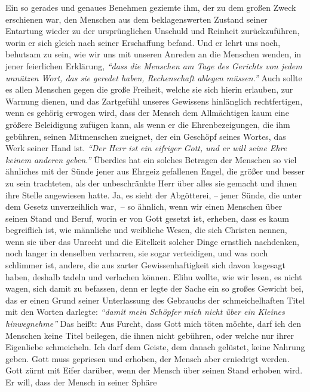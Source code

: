 Ein so gerades und genaues Benehmen geziemte ihm, der zu dem großen Zweck
erschienen war, den Menschen aus dem beklagenswerten Zustand seiner Entartung
wieder zu der ursprünglichen Unschuld und Reinheit zurückzuführen, worin er sich
gleich nach seiner Erschaffung befand. Und er lehrt uns noch, behutsam zu sein,
wie wir uns mit unseren Anreden an die Menschen wenden, in jener feierlichen
Erklärung,
\textit{"`dass die Menschen am Tage des Gerichts von jedem unnützen Wort, das
sie geredet haben, Rechenschaft ablegen
müssen."'}
Auch sollte es allen Menschen gegen die große Freiheit, welche sie sich hierin
erlauben, zur Warnung dienen, und das Zartgefühl unseres Gewissens hinlänglich
rechtfertigen, wenn es gehörig erwogen wird, dass der Mensch dem Allmächtigen
kaum eine größere Beleidigung zufügen kann, als wenn er die Ehrenbezeigungen,
die ihm gebühren, seinen Mitmenschen zueignet, der ein Geschöpf seines Wortes,
das Werk seiner Hand ist.
\textit{"`Der Herr ist ein eifriger Gott, und er will seine
Ehre keinem anderen geben."'} Überdies hat ein solches Betragen der Menschen so
viel ähnliches mit der Sünde jener aus Ehrgeiz gefallenen Engel, die größer und
besser zu sein trachteten, als der unbeschränkte Herr über alles sie gemacht und
ihnen ihre Stelle angewiesen hatte. Ja, es sieht der Abgötterei, -- jener
Sünde,
die unter dem Gesetz unverzeihlich war,~-- so ähnlich, wenn wir einen Menschen
über seinen Stand und Beruf, worin er von Gott gesetzt ist, erheben, dass es
kaum
begreiflich ist, wie männliche und weibliche Wesen, die sich Christen nennen,
wenn sie über das Unrecht und die Eitelkeit solcher Dinge ernstlich nachdenken,
noch langer in denselben verharren, sie sogar verteidigen, und was noch
schlimmer ist, andere, die aus zarter Gewissenhaftigkeit sich davon losgesagt
haben, deshalb tadeln und verlachen können. Elihu wollte, wie wir lesen, es
nicht wagen, sich damit zu befassen, denn er legte der Sache ein so großes
Gewicht bei, das er einen Grund seiner Unterlassung des Gebrauchs der
schmeichelhaften Titel mit den Worten darlegte:
\textit{"`damit mein Schöpfer mich nicht
über ein Kleines hinwegnehme"'} Das heißt: Aus Furcht, dass Gott mich töten
möchte,
darf ich den Menschen keine Titel beilegen, die ihnen nicht gebühren, oder
welche nur ihrer Eigenliebe schmeicheln. Ich darf dem Geiste, dem
danach gelüstet, keine Nahrung geben. Gott muss gepriesen und erhoben, der
Mensch aber erniedrigt werden. Gott zürnt mit Eifer darüber,
wenn der Mensch
über seinen Stand erhoben wird. Er will, dass der Mensch in seiner Sphäre
